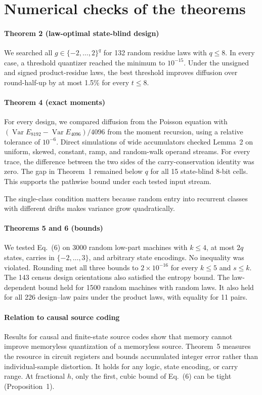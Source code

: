\documentclass[11pt]{article}
\newcommand{\Var}{\operatorname{Var}}
\begin{document}
\section{Numerical checks of the theorems}

\paragraph{Theorem 2 (law-optimal state-blind design)}
We searched all $g\in\{-2,\ldots,2\}^q$ for 132 random residue laws
with $q\le8$. In every case, a threshold quantizer reached the
minimum to $10^{-15}$. Under the unsigned and signed product-residue laws,
the best threshold
improves diffusion over round-half-up by at most 1.5\% for every $t\le8$.

\paragraph{Theorem 4 (exact moments)}
For every design, we compared diffusion from the Poisson equation with
$(\Var E_{8192}-\Var E_{4096})/4096$ from the moment recursion, using a
relative tolerance of $10^{-6}$. Direct simulations of wide accumulators
checked Lemma~2 on uniform, skewed, constant, ramp, and random-walk operand
streams. For every trace, the difference between the two sides of the
carry-conservation identity was zero. The gap in Theorem~1 remained
below $q$ for all 15 state-blind 8-bit cells. This supports the
pathwise bound under each tested input stream.

The single-class condition matters because random entry into recurrent
classes with different drifts makes variance grow quadratically.

\paragraph{Theorems 5 and 6 (bounds)}
We tested Eq.~(6) on 3000 random low-part machines with $k\le4$, at most
$2q$ states, carries in $\{-2,\ldots,3\}$, and arbitrary state encodings.
No inequality was violated. Rounding met all three bounds to
$2\times10^{-16}$ for every $k\le5$ and $s\le k$.
The 143 census design orientations also satisfied the entropy bound.
The law-dependent bound held for 1500 random machines with random
laws. It also held for all 226 design--law pairs under the product
laws, with equality for 11 pairs.

\paragraph{Relation to causal source coding}
Results for causal and finite-state source codes show that memory cannot
improve memoryless quantization of a memoryless source. Theorem~5
measures the resource in circuit registers and bounds accumulated
integer error rather than individual-sample distortion. It holds
for any logic, state encoding, or carry range. At fractional $h$, only the
first, cubic bound of Eq.~(6) can be tight (Proposition~1).
\end{document}
